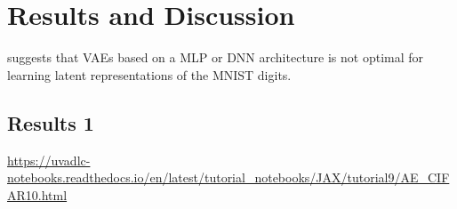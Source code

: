 \newpage
\section{Results and Discussion}\label{sec:Results}


suggests that VAEs based on a MLP or DNN architecture is not optimal for learning latent representations of the MNIST digits.

\subsection{Results 1}\label{sec:project results}



\url{https://uvadlc-notebooks.readthedocs.io/en/latest/tutorial_notebooks/JAX/tutorial9/AE_CIFAR10.html}





